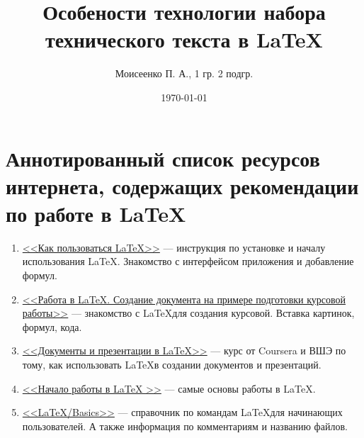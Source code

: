 \documentclass[a4paper,12pt]{article} %
\author{Моисеенко П. А., 1 гр. 2 подгр.}
\title{Особености технологии набора технического текста в \LaTeX{}}
\date{\today}
\begin{document}
\maketitle
\newpage
\section*{Аннотированный список ресурсов интернета, содержащих рекомендации по работе в \LaTeX}
\begin{enumerate}
\item \href{https://losst.ru/kak-polzovatsya-latex}{<<Как пользоваться LaTeX>>} --- инструкция по установке и началу использования \LaTeX. Знакомство с интерфейсом приложения и добавление формул.
\item \href{https://www.ibm.com/developerworks/ru/library/latex_tutorial_01/index.html}{<<Работа в LaTeX. Создание документа на примере подготовки курсовой работы>>} --- знакомство с \LaTeX для создания курсовой. Вставка картинок, формул, кода.
\item \href{https://ru.coursera.org/learn/latex}{<<Документы и презентации в LaTeX>>} --- курс от Coursera и ВШЭ по тому, как использовать \LaTeX в создании документов и презентаций.
\item \href{http://scibooks.narod.ru/ladocs/begin.html}{<<Начало работы в LaTeX
>>} --- самые основы работы в \LaTeX.
\item \href{https://en.wikibooks.org/wiki/LaTeX/Basics}{<<LaTeX/Basics>>} --- справочник по командам \LaTeX для начинающих пользователей. А также информация по комментариям и названию файлов.
\end{enumerate}
\end{document}
